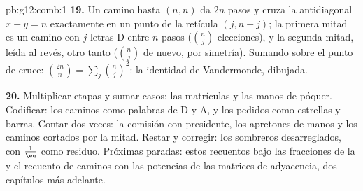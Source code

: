 \begin{solution}{pb:g12:comb:1}
\textbf{19.} Un camino hasta $(n, n)$ da $2n$ pasos y cruza la antidiagonal
$x + y = n$ exactamente en un punto de la retícula $(j, n - j)$; la primera
mitad es un camino con $j$ letras D entre $n$ pasos ($\binom nj$
elecciones), y la segunda mitad, leída al revés, otro tanto ($\binom nj$ de
nuevo, por simetría). Sumando sobre el punto de cruce:
$\binom{2n}{n} = \sum_j \binom nj^2$: la identidad de Vandermonde,
dibujada.

\textbf{20.} Multiplicar etapas y sumar casos: las matrículas y las manos
de póquer. Codificar: los caminos como palabras de D y A, y los pedidos
como estrellas y barras. Contar dos veces: la comisión con presidente, los
apretones de manos y los caminos cortados por la mitad. Restar y corregir:
los sombreros desarreglados, con $\frac1\eu$ como residuo. Próximas
paradas: estos recuentos bajo las fracciones de la  y el
recuento de caminos con las potencias de las matrices de adyacencia, dos
capítulos más adelante.
\end{solution}
